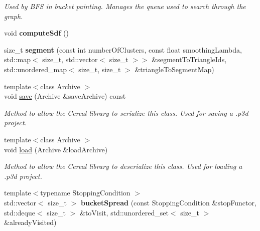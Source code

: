 \begin{DoxyCompactItemize}
\begin{DoxyCompactList}\small\item\em Used by B\+FS in bucket painting. Manages the queue used to search through the graph. \end{DoxyCompactList}\item 
\mbox{\label{classpepr3d_1_1_geometry_a2dbc2ee792c43857a7d9b1d16b3320df}} 
void {\bfseries compute\+Sdf} ()
\item 
\mbox{\label{classpepr3d_1_1_geometry_ab00aaf9b4fdf18c56d57e8f0d646ab45}} 
size\+\_\+t {\bfseries segment} (const int number\+Of\+Clusters, const float smoothing\+Lambda, std\+::map$<$ size\+\_\+t, std\+::vector$<$ size\+\_\+t $>$$>$ \&segment\+To\+Triangle\+Ids, std\+::unordered\+\_\+map$<$ size\+\_\+t, size\+\_\+t $>$ \&triangle\+To\+Segment\+Map)
\item 
\mbox{\label{classpepr3d_1_1_geometry_a531c94e0221f47462af2c9b5f0961e56}} 
{\footnotesize template$<$class Archive $>$ }\\void \mbox{\hyperlink{classpepr3d_1_1_geometry_a531c94e0221f47462af2c9b5f0961e56}{save}} (Archive \&save\+Archive) const
\begin{DoxyCompactList}\small\item\em Method to allow the Cereal library to serialize this class. Used for saving a .p3d project. \end{DoxyCompactList}\item 
\mbox{\label{classpepr3d_1_1_geometry_a2a8b9b75eb5033c9af30570ace03e921}} 
{\footnotesize template$<$class Archive $>$ }\\void \mbox{\hyperlink{classpepr3d_1_1_geometry_a2a8b9b75eb5033c9af30570ace03e921}{load}} (Archive \&load\+Archive)
\begin{DoxyCompactList}\small\item\em Method to allow the Cereal library to deserialize this class. Used for loading a .p3d project. \end{DoxyCompactList}\item 
\mbox{\label{classpepr3d_1_1_geometry_a383d95503293a68382275bc269280690}} 
{\footnotesize template$<$typename Stopping\+Condition $>$ }\\std\+::vector$<$ size\+\_\+t $>$ {\bfseries bucket\+Spread} (const Stopping\+Condition \&stop\+Functor, std\+::deque$<$ size\+\_\+t $>$ \&to\+Visit, std\+::unordered\+\_\+set$<$ size\+\_\+t $>$ \&already\+Visited)
$$
\end{DoxyCompactItemize}
